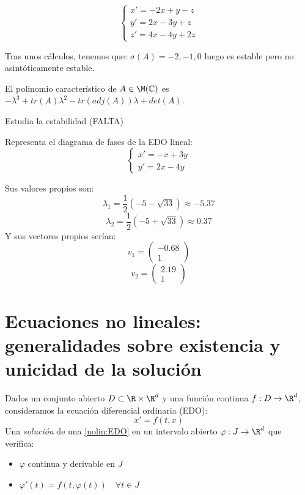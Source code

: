 \begin{ejer}
\[
\left\{\begin{array}{ll}
x'=-2x+y-z\\
y'=2x-3y+z\\
z'=4x-4y+2z
\end{array}\right.
\]

Tras unos cálculos, tenemos que: $\sigma(A)={-2,-1,0}$ luego es estable pero no asintóticamente estable.
\end{ejer}

\begin{nota}
 El polinomio característico de $A\in\M(\mathbb{C})$ es $-\lambda^3+tr(A)\lambda^2-tr(adj(A))\lambda+det(A)$.
\end{nota}

\begin{ejer}
Estudia la estabilidad (FALTA)
\end{ejer}

\begin{ejer}
Representa el diagrama de fases de la EDO lineal:
\[
\left\{\begin{array}{ll}
x'=-x+3y\\
y'=2x-4y
\end{array}\right.
\]
\end{ejer}

\begin{sol}
Sus valores propios son:
$$\lambda_1=\frac{1}{2}(-5-\sqrt{33})\approx -5.37$$
$$\lambda_2=\frac{1}{2}(-5+\sqrt{33})\approx 0.37$$
Y sus vectores propios serían:
$$v_1=\begin{pmatrix}-0.68 \\ 1 \end{pmatrix} $$
$$v_2=\begin{pmatrix}2.19 \\ 1 \end{pmatrix} $$
\end{sol}


\section{Ecuaciones no lineales: generalidades sobre existencia y unicidad de la solución}

\begin{ndef}
Dados un conjunto abierto $D \subset \R \times \R^d$ y una función continua $f:D\to \R^d$, consideramos la ecuación diferencial ordinaria (EDO):
\begin{equation}
x'=f(t,x) \tag{EDO}\label{nolin:EDO}
\end{equation}
Una \emph{solución} de una \ref{nolin:EDO} en un intervalo abierto $\varphi:J\to\R^d$ que verifica:
\begin{itemize}
\item $\varphi$ continua y derivable en $J$
\item $\varphi'(t)=f(t,\varphi(t)) \quad \forall t \in J$
\end{itemize}
\end{ndef}

